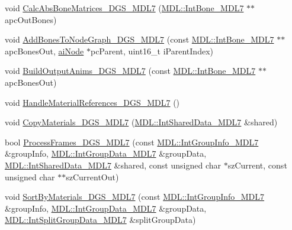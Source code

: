 \begin{DoxyCompactItemize}
\item 
void \hyperlink{class_assimp_1_1_m_d_l_importer_ab59d06605bc1d9be58849dfdd3a3a124}{Calc\+Abs\+Bone\+Matrices\+\_\+D\+G\+S\+\_\+\+M\+D\+L7} (\hyperlink{struct_assimp_1_1_m_d_l_1_1_int_bone___m_d_l7}{M\+D\+L\+::\+Int\+Bone\+\_\+\+M\+D\+L7} $\ast$$\ast$apc\+Out\+Bones)
\item 
void \hyperlink{class_assimp_1_1_m_d_l_importer_aac2bc9c7bd6ab09ea4db7a08f67b8379}{Add\+Bones\+To\+Node\+Graph\+\_\+D\+G\+S\+\_\+\+M\+D\+L7} (const \hyperlink{struct_assimp_1_1_m_d_l_1_1_int_bone___m_d_l7}{M\+D\+L\+::\+Int\+Bone\+\_\+\+M\+D\+L7} $\ast$$\ast$apc\+Bones\+Out, \hyperlink{structai_node}{ai\+Node} $\ast$pc\+Parent, uint16\+\_\+t i\+Parent\+Index)
\item 
void \hyperlink{class_assimp_1_1_m_d_l_importer_a422ec6cf770baff52fccccc1588f0238}{Build\+Output\+Anims\+\_\+D\+G\+S\+\_\+\+M\+D\+L7} (const \hyperlink{struct_assimp_1_1_m_d_l_1_1_int_bone___m_d_l7}{M\+D\+L\+::\+Int\+Bone\+\_\+\+M\+D\+L7} $\ast$$\ast$apc\+Bones\+Out)
\item 
void \hyperlink{class_assimp_1_1_m_d_l_importer_aac31e6714d5e76b9c60327997c6f5817}{Handle\+Material\+References\+\_\+D\+G\+S\+\_\+\+M\+D\+L7} ()
\item 
void \hyperlink{class_assimp_1_1_m_d_l_importer_acf97233c63ea11215c527603893ea985}{Copy\+Materials\+\_\+D\+G\+S\+\_\+\+M\+D\+L7} (\hyperlink{struct_assimp_1_1_m_d_l_1_1_int_shared_data___m_d_l7}{M\+D\+L\+::\+Int\+Shared\+Data\+\_\+\+M\+D\+L7} \&shared)
\item 
bool \hyperlink{class_assimp_1_1_m_d_l_importer_a52529265d0a93d200ad62a86d6c48c23}{Process\+Frames\+\_\+D\+G\+S\+\_\+\+M\+D\+L7} (const \hyperlink{struct_assimp_1_1_m_d_l_1_1_int_group_info___m_d_l7}{M\+D\+L\+::\+Int\+Group\+Info\+\_\+\+M\+D\+L7} \&group\+Info, \hyperlink{struct_assimp_1_1_m_d_l_1_1_int_group_data___m_d_l7}{M\+D\+L\+::\+Int\+Group\+Data\+\_\+\+M\+D\+L7} \&group\+Data, \hyperlink{struct_assimp_1_1_m_d_l_1_1_int_shared_data___m_d_l7}{M\+D\+L\+::\+Int\+Shared\+Data\+\_\+\+M\+D\+L7} \&shared, const unsigned char $\ast$sz\+Current, const unsigned char $\ast$$\ast$sz\+Current\+Out)
\item 
void \hyperlink{class_assimp_1_1_m_d_l_importer_a56685b45106f4b483c1fb5fc5fce5ba7}{Sort\+By\+Materials\+\_\+D\+G\+S\+\_\+\+M\+D\+L7} (const \hyperlink{struct_assimp_1_1_m_d_l_1_1_int_group_info___m_d_l7}{M\+D\+L\+::\+Int\+Group\+Info\+\_\+\+M\+D\+L7} \&group\+Info, \hyperlink{struct_assimp_1_1_m_d_l_1_1_int_group_data___m_d_l7}{M\+D\+L\+::\+Int\+Group\+Data\+\_\+\+M\+D\+L7} \&group\+Data, \hyperlink{struct_assimp_1_1_m_d_l_1_1_int_split_group_data___m_d_l7}{M\+D\+L\+::\+Int\+Split\+Group\+Data\+\_\+\+M\+D\+L7} \&split\+Group\+Data)

\end{DoxyCompactItemize}
